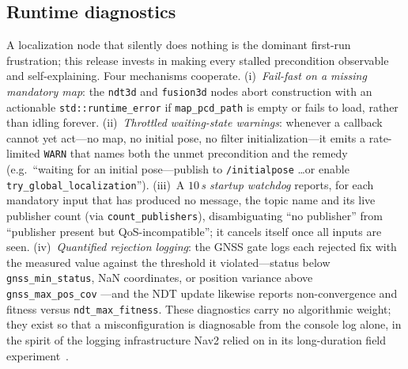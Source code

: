 \subsection{Runtime diagnostics}
A localization node that silently does nothing is the dominant
first-run frustration; this release invests in making every stalled
precondition observable and self-explaining. Four mechanisms cooperate.
(i)~\emph{Fail-fast on a missing mandatory map}: the \texttt{ndt3d} and
\texttt{fusion3d} nodes abort construction with an actionable
\texttt{std::runtime\_error} if \texttt{map\_pcd\_path} is empty or
fails to load, rather than idling forever. (ii)~\emph{Throttled
waiting-state warnings}: whenever a callback cannot yet act---no map,
no initial pose, no filter initialization---it emits a rate-limited
\texttt{WARN} that names both the unmet precondition and the remedy
(e.g.\ ``waiting for an initial pose---publish to \texttt{/initialpose}
\ldots or enable \texttt{try\_global\_localization}''). (iii)~A
\emph{$10$\,s startup watchdog} reports, for each mandatory
input that has produced no message, the topic name and its live
publisher count (via \texttt{count\_publishers}), disambiguating ``no
publisher'' from ``publisher present but QoS-incompatible''; it cancels
itself once all inputs are seen. (iv)~\emph{Quantified rejection
logging}: the GNSS gate logs each rejected fix with the measured value
against the threshold it violated---status below \texttt{gnss\_min\_status},
NaN coordinates, or position variance above \texttt{gnss\_max\_pos\_cov}
---and the NDT update likewise reports non-convergence and fitness
versus \texttt{ndt\_max\_fitness}. These diagnostics carry no algorithmic
weight; they exist so that a misconfiguration is diagnosable from the
console log alone, in the spirit of the logging infrastructure Nav2
relied on in its long-duration field experiment~\cite{macenski2020marathon}.
